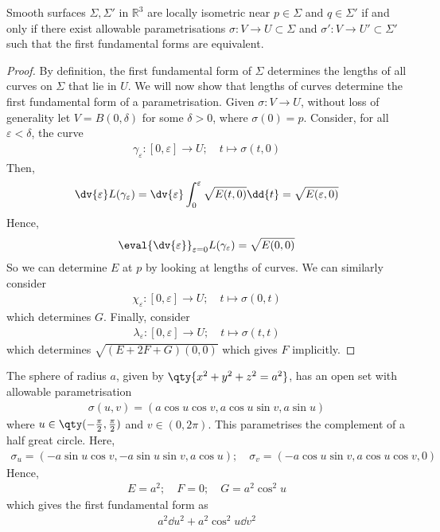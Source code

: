 \begin{lemma}
	Smooth surfaces $\Sigma, \Sigma'$ in $\mathbb R^3$ are locally isometric near $p \in \Sigma$ and $q \in \Sigma'$ if and only if there exist allowable parametrisations $\sigma \colon V \to U \subset \Sigma$ and $\sigma' \colon V \to U' \subset \Sigma'$ such that the first fundamental forms are equivalent.
\end{lemma}
\begin{proof}
	By definition, the first fundamental form of $\Sigma$ determines the lengths of all curves on $\Sigma$ that lie in $U$.
	We will now show that lengths of curves determine the first fundamental form of a parametrisation.
	Given $\sigma \colon V \to U$, without loss of generality let $V = B(0,\delta)$ for some $\delta > 0$, where $\sigma(0) = p$.
	Consider, for all $\varepsilon < \delta$, the curve
	\begin{align*}
		\gamma_\varepsilon \colon [0,\varepsilon] \to U;\quad t \mapsto \sigma(t,0)
	\end{align*}
	Then,
	\begin{align*}
		\dv{\varepsilon} L(\gamma_\varepsilon) = \dv{\varepsilon} \int_0^\varepsilon \sqrt{E(t,0)} \dd{t} = \sqrt{E(\varepsilon,0)}
	\end{align*}
	Hence,
	\begin{align*}
		\eval{\dv{\varepsilon}}_{\varepsilon = 0} L(\gamma_\varepsilon) = \sqrt{E(0,0)}
	\end{align*}
	So we can determine $E$ at $p$ by looking at lengths of curves.
	We can similarly consider
	\begin{align*}
		\chi_\varepsilon \colon [0,\varepsilon] \to U;\quad t \mapsto \sigma(0,t)
	\end{align*}
	which determines $G$.
	Finally, consider
	\begin{align*}
		\lambda_\varepsilon \colon [0,\varepsilon] \to U;\quad t \mapsto \sigma(t,t)
	\end{align*}
	which determines $\sqrt{(E+2F+G)(0,0)}$ which gives $F$ implicitly.
\end{proof}
\begin{example}
	The sphere of radius $a$, given by $\qty{x^2 + y^2 + z^2 = a^2}$, has an open set with allowable parametrisation
	\begin{align*}
		\sigma(u,v) = (a\cos u \cos v, a \cos u \sin v, a \sin u)
	\end{align*}
	where $u \in \qty(-\frac{\pi}{2}, \frac{\pi}{2})$ and $v \in (0,2\pi)$.
	This parametrises the complement of a half great circle.
	Here,
	\begin{align*}
		\sigma_u = (-a \sin u \cos v, -a \sin u \sin v, a \cos u);\quad \sigma_v = (-a \cos u \sin v, a \cos u \cos v, 0)
	\end{align*}
	Hence,
	\begin{align*}
		E = a^2; \quad F = 0;\quad G = a^2 \cos^2 u
	\end{align*}
	which gives the first fundamental form as
	\begin{align*}
		a^2 \dd{u}^2 + a^2 \cos^2 u \dd{v}^2
	\end{align*}
\end{example}
